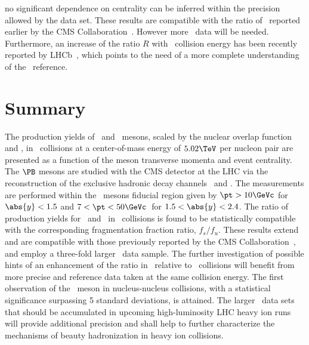 no significant dependence on centrality can be inferred within the precision allowed by the data set.
These results are compatible with the ratio of \RAA\ reported earlier by the CMS Collaboration~\cite{BsPbPbCMS}.
However more \PbPb\ data will be needed. Furthermore, an increase of the ratio $R$ with \pp\ collision energy has been recently reported by LHCb~\cite{fsfulhcb2020}, 
which points to the need of a more complete understanding of the \pp\ reference. 


\section{Summary}

The production yields %
of \PBzs\ and \PBp\ mesons,
scaled by the nuclear overlap function \TAA and \NMB,
in \PbPb\ collisions at a center-of-mass energy of $5.02\TeV$ per nucleon pair are presented as a function of the meson transverse momenta and event centrality.
The $\PB$ mesons are studied with the CMS detector at the LHC via the reconstruction of the exclusive hadronic decay channels \Bzerosdecayall\ and \Bplusdecayall. 
The measurements are performed within the \PB\ mesons fiducial region given by 
$\pt>10\GeVc$ for $\abs{y}<1.5$  and  $7<\pt<50\GeVc \,$ for $1.5<\abs{y}<2.4$.
%
The ratio of production yields for \PBzs\ and \PBp\ in \PbPb\ collisions is found to be statistically compatible with the corresponding fragmentation fraction ratio, $f_s/f_u$.  
%
These results extend and are compatible with those previously reported by the CMS Collaboration~\cite{BsPbPbCMS,BpPbPbCMS}, and employ a three-fold larger \PbPb\ data sample.
The further investigation of possible hints of an enhancement of the ratio in \PbPb\ relative to \pp\ collisions will benefit from more precise \PbPb and \pp reference data taken at the same collision energy.  
The first observation of the \PBzs\ meson in nucleus-nucleus collisions, with a statistical significance surpassing 5 standard deviations, is attained. 
%
The larger \PbPb\ data sets that should be accumulated in upcoming high-luminosity LHC heavy ion runs will provide additional precision and shall help to further characterize the mechanisms of beauty hadronization in heavy ion collisions.

